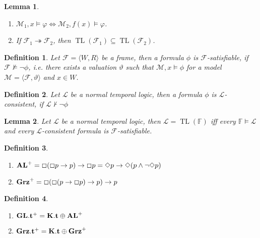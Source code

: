 \documentclass[a4paper]{article}
\theoremstyle{defin}
\newtheorem{defin}{Definition}
\theoremstyle{theorem}
\theoremstyle{prop}
\theoremstyle{lemma}
\newtheorem{lemma}{Lemma}
\theoremstyle{ex}
\theoremstyle{col}
\begin{document}
\begin{lemma}
  $ $

  \begin{enumerate}
    \item $\mathcal{M}_1, x \models \varphi \Leftrightarrow \mathcal{M}_2, f(x) \models \varphi$.
    \item If $\mathcal{F}_1 \twoheadrightarrow \mathcal{F}_2$, then $\operatorname{TL}(\mathcal{F}_1) \subseteq \operatorname{TL}(\mathcal{F}_2)$.
  \end{enumerate}
\end{lemma}

\begin{defin}
  Let $\mathcal{F} = \langle W, R \rangle$ be a frame, then a formula $\phi$ is $\mathcal{F}$-satisfiable, if $\mathcal{F} \nvDash \neg \phi$, i.e. there exists a valuation $\vartheta$ such that $\mathcal{M}, x \models \phi$ for a model $\mathcal{M} = \langle \mathcal{F}, \vartheta \rangle$ and $x \in W$.
\end{defin}

\begin{defin}
  Let $\mathcal{L}$ be a normal temporal logic, then a formula $\phi$ is $\mathcal{L}$-consistent, if $\mathcal{L} \nvdash \neg \phi$
\end{defin}

\begin{lemma}
  Let $\mathcal{L}$ be a normal temporal logic, then $\mathcal{L} = \operatorname{TL}(\mathbb{F})$ iff every $\mathbb{F} \models \mathcal{L}$ and every $\mathcal{L}$-consistent formula is $\mathcal{F}$-satisfiable.
\end{lemma}

\begin{defin}
$ $

  \begin{enumerate}
    \item ${\bf AL}^{+} = \Box (\Box p \to p) \to \Box p = \Diamond p \to \Diamond (p \land \neg \Diamond p)$
    \item ${\bf Grz}^{+} = \Box (\Box (p \to \Box p) \to p) \to p$
  \end{enumerate}
\end{defin}

\begin{defin}
$ $

  \begin{enumerate}
    \item ${\bf GL}.{\bf t}^{+} = {\bf K}.{\bf t} \oplus {\bf AL}^{+}$
    \item ${\bf Grz}.{\bf t}^{+} = {\bf K}.{\bf t} \oplus {\bf Grz}^{+}$
  \end{enumerate}
\end{defin}
\end{document}
